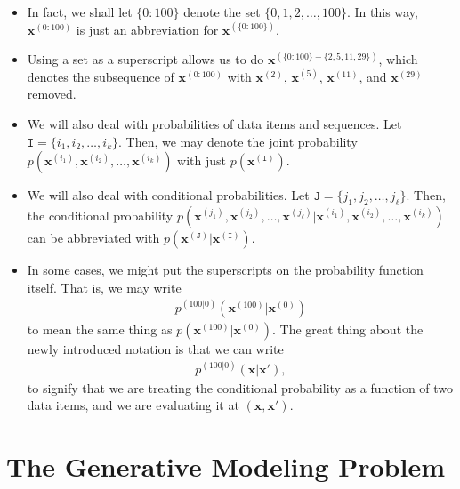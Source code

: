 \documentclass[10pt]{article}
\newcommand{\ve}[1]{\mathbf{#1}}
\begin{document}
\begin{itemize}
  \item In fact, we shall let $\{0:100\}$ denote the set $\{0, 1, 2, \dotsc, 100\}$. In this way, $\ve{x}^{(0:100)}$ is just an abbreviation for $\ve{x}^{(\{0:100\})}$.
  
  \item Using a set as a superscript allows us to do $\ve{x}^{(\{ 0:100\} - \{ 2, 5, 11, 29\})}$, which denotes the subsequence of $\ve{x}^{(0:100)}$ with $\ve{x}^{(2)}$, $\ve{x}^{(5)}$, $\ve{x}^{(11)}$, and $\ve{x}^{(29)}$ removed.

  \item We will also deal with probabilities of data items and sequences. Let $\mathtt{I} = \{ i_1, i_2, \dotsc, i_k \}$. Then, we may denote the joint probability $p(\ve{x}^{(i_1)}, \ve{x}^{(i_2)}, \dotsc, \ve{x}^{(i_k)})$ with just $p(\ve{x}^{(\mathtt{I})})$. 
  
  \item We will also deal with conditional probabilities. Let $\mathtt{J} = \{ j_1, j_2, \dotsc, j_\ell \}$. Then, the conditional probability $p(\ve{x}^{(j_1)}, \ve{x}^{(j_2)}, \dotsc, \ve{x}^{(j_\ell)} | \ve{x}^{(i_1)}, \ve{x}^{(i_2)}, \dotsc, \ve{x}^{(i_k)})$ can be abbreviated with $p(\ve{x}^{(\mathtt{J})} | \ve{x}^{(\mathtt{I})})$.
  
  \item In some cases, we might put the superscripts on the probability function itself. That is, we may write
  \begin{align*}
    p^{(100|0)}(\ve{x}^{(100)}|\ve{x}^{(0)})
  \end{align*}
  to mean the same thing as $p(\ve{x}^{(100)}|\ve{x}^{(0)})$. The great thing about the newly introduced notation is that we can write
  \begin{align*}
    p^{(100|0)}(\ve{x}|\ve{x}'),
  \end{align*}
  to signify that we are treating the conditional probability as a function of two data items, and we are evaluating it at $(\ve{x},\ve{x}')$.
\end{itemize}

\section{The Generative Modeling Problem}
\end{document}
